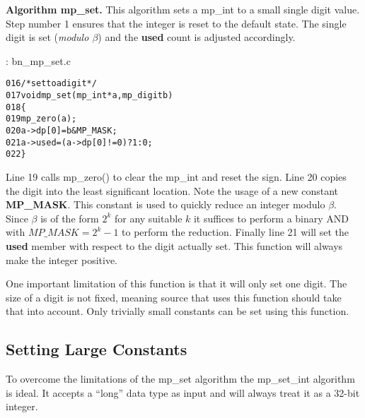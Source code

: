 \documentclass[b5paper]{book}
\begin{document}
\textbf{Algorithm mp\_set.}
This algorithm sets a mp\_int to a small single digit value.  Step number 1 ensures that the integer is reset to the default state.  The
single digit is set (\textit{modulo $\beta$}) and the \textbf{used} count is adjusted accordingly.

\vspace{+3mm}\begin{small}
\hspace{-5.1mm}{\bf File}: bn\_mp\_set.c
\vspace{-3mm}
\begin{alltt}
016   /* set to a digit */
017   void mp_set (mp_int * a, mp_digit b)
018   \{
019     mp_zero (a);
020     a->dp[0] = b & MP_MASK;
021     a->used  = (a->dp[0] != 0) ? 1 : 0;
022   \}
\end{alltt}
\end{small}

Line 19 calls mp\_zero() to clear the mp\_int and reset the sign.  Line 20 copies the digit 
into the least significant location.  Note the usage of a new constant \textbf{MP\_MASK}.  This constant is used to quickly
reduce an integer modulo $\beta$.  Since $\beta$ is of the form $2^k$ for any suitable $k$ it suffices to perform a binary AND with 
$MP\_MASK = 2^k - 1$ to perform the reduction.  Finally line 21 will set the \textbf{used} member with respect to the 
digit actually set. This function will always make the integer positive.

One important limitation of this function is that it will only set one digit.  The size of a digit is not fixed, meaning source that uses 
this function should take that into account.  Only trivially small constants can be set using this function.

\subsection{Setting Large Constants}
To overcome the limitations of the mp\_set algorithm the mp\_set\_int algorithm is ideal.  It accepts a ``long''
data type as input and will always treat it as a 32-bit integer.
\end{document}
